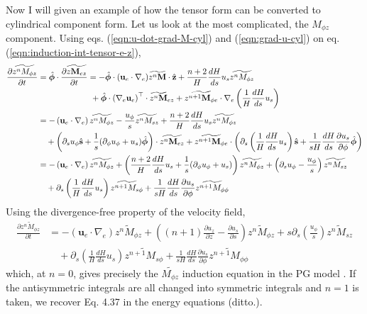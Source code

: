 Now I will given an example of how the tensor form can be converted to cylindrical component form. Let us look at the most complicated, the $M_{\phi z}$ component. Using eqs. (\ref{eqn:u-dot-grad-M-cyl}) and (\ref{eqn:grad-u-cyl}) on eq. (\ref{eqn:induction-int-tensor-e-z}),
%
\[\begin{aligned}
    \frac{\partial \widetilde{z^n M_{\phi z}}}{\partial t} &= \hat{\bm{\phi}}\cdot \frac{\partial \widetilde{z \mathbf{M}_{ez}}}{\partial t} = - \hat{\bm{\phi}}\cdot (\mathbf{u}_e\cdot \nabla_e) \widetilde{z^n \mathbf{M}} \cdot \hat{\mathbf{z}} + \frac{n+2}{H}\frac{dH}{ds} u_s \widetilde{z^n M_{\phi z}} \\
    &\mkern 115mu + \hat{\bm{\phi}}\cdot \left(\nabla_e \mathbf{u}_e\right)^\top\cdot \widetilde{z^n \mathbf{M}}_{ez} + \widetilde{z^{n+1} \mathbf{M}_{\phi e}}\cdot \nabla_e \left(\frac{1}{H}\frac{dH}{ds}u_s\right) \\ 
    &= - \left(\mathbf{u}_e\cdot \nabla_e\right) \widetilde{z^n M_{\phi z}} - \frac{u_\phi}{s} \widetilde{z^n M_{sz}} + \frac{n+2}{H}\frac{dH}{ds} u_s \widetilde{z^n M_{\phi z}} \\ 
    &\quad + \left(\partial_s u_\phi \hat{\mathbf{s}} + \frac{1}{s}(\partial_\phi u_\phi + u_s) \hat{\bm{\phi}}\right)\cdot \widetilde{z^n \mathbf{M}_{ez}} + \widetilde{z^{n+1} \mathbf{M}_{\phi e}}\cdot \left(\partial_s \left(\frac{1}{H}\frac{dH}{ds}u_s\right) \hat{\mathbf{s}} + \frac{1}{sH}\frac{dH}{ds}\frac{\partial u_s}{\partial \phi}\hat{\bm{\phi}}\right) \\ 
    &= - \left(\mathbf{u}_e\cdot \nabla_e\right) \widetilde{z^n M_{\phi z}} + \left(\frac{n+2}{H}\frac{dH}{ds} u_s + \frac{1}{s}(\partial_\phi u_\phi + u_s)\right) \widetilde{z^n M_{\phi z}} + \left(\partial_s u_\phi - \frac{u_\phi}{s}\right) \widetilde{z^n M_{sz}} \\ 
    &\quad + \partial_s \left(\frac{1}{H}\frac{dH}{ds}u_s\right) \widetilde{z^{n+1} M_{s\phi}} + \frac{1}{sH}\frac{dH}{ds}\frac{\partial u_s}{\partial \phi} \widetilde{z^{n+1} M_{\phi\phi}}
\end{aligned}\]
%
Using the divergence-free property of the velocity field,
%
\[\begin{aligned}
    \frac{\partial \widetilde{z^n M_{\phi z}}}{\partial t} &= - (\mathbf{u}_e\cdot \nabla_e) \widetilde{z^n M_{\phi z}} + \left((n+1)\frac{\partial u_z}{\partial z} - \frac{\partial u_s}{\partial s}\right) \widetilde{z^n M_{\phi z}} + s\partial_s\left(\frac{u_\phi}{s}\right) \widetilde{z^n M_{sz}} \\
    &\quad + \partial_s \left(\frac{1}{H}\frac{dH}{ds}u_s\right) \widetilde{z^{n+1} M_{s\phi}} + \frac{1}{sH}\frac{dH}{ds}\frac{\partial u_s}{\partial \phi} \widetilde{z^{n+1} M_{\phi\phi}}
\end{aligned}\]
%
which, at $n=0$, gives precisely the $\widetilde{M_{\phi z}}$ induction equation in the PG model \citep[Eq. 4.26 in][]{jackson_plesio-geostrophy_2020}. If the antisymmetric integrals are all changed into symmetric integrals and $n=1$ is taken, we recover Eq. 4.37 in the energy equations (ditto.).


